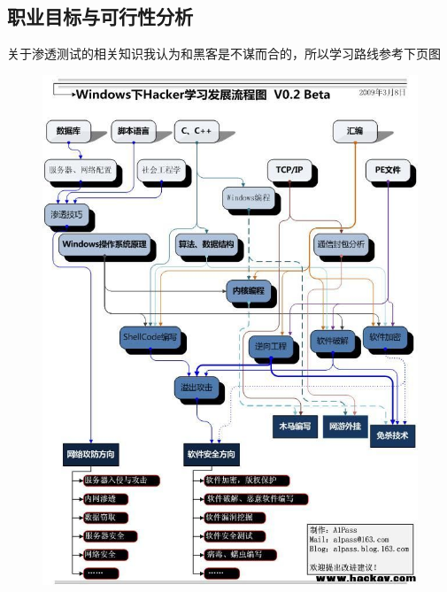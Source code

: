 \documentclass{article}
\begin{document}
\subsection{职业目标与可行性分析}
	关于渗透测试的相关知识我认为和黑客是不谋而合的，所以学习路线参考下页图\par
	\begin{figure}[h!]
	\centering
	\includegraphics[scale=0.4]{growing.jpg}
	\end{figure}
\end{document}

